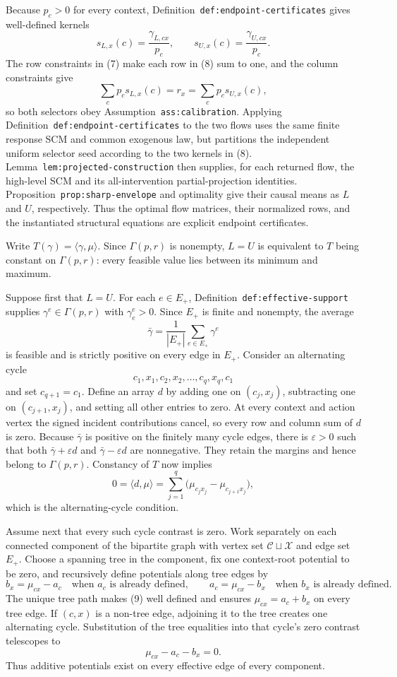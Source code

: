 Because \(p_c>0\) for every context, Definition~\texttt{def:endpoint-certificates} gives well-defined kernels
\[
s_{L,x}(c)=\frac{\gamma_{L,cx}}{p_c},
\qquad
s_{U,x}(c)=\frac{\gamma_{U,cx}}{p_c}.
\tag{8}
\]
The row constraints in (7) make each row in (8) sum to one, and the column constraints give
\[
\sum_cp_cs_{L,x}(c)=r_x
=\sum_cp_cs_{U,x}(c),
\]
so both selectors obey Assumption~\texttt{ass:calibration}.  Applying Definition~\texttt{def:endpoint-certificates} to the two flows uses the same finite response SCM and common exogenous law, but partitions the independent uniform selector seed according to the two kernels in (8).  Lemma~\texttt{lem:projected-construction} then supplies, for each returned flow, the high-level SCM and its all-intervention partial-projection identities.  Proposition~\texttt{prop:sharp-envelope} and optimality give their causal means as \(L\) and \(U\), respectively.  Thus the optimal flow matrices, their normalized rows, and the instantiated structural equations are explicit endpoint certificates.

Write \(T(\gamma)=\langle\gamma,\mu\rangle\).  Since \(\Gamma(p,r)\) is nonempty, \(L=U\) is equivalent to \(T\) being constant on \(\Gamma(p,r)\): every feasible value lies between its minimum and maximum.

Suppose first that \(L=U\).  For each \(e\in E_+\), Definition~\texttt{def:effective-support} supplies \(\gamma^{e}\in\Gamma(p,r)\) with \(\gamma^{e}_e>0\).  Since \(E_+\) is finite and nonempty, the average
\[
\bar\gamma=\frac{1}{|E_+|}\sum_{e\in E_+}\gamma^e
\]
is feasible and is strictly positive on every edge in \(E_+\).  Consider an alternating cycle
\[
c_1,x_1,c_2,x_2,\ldots,c_q,x_q,c_1
\]
and set \(c_{q+1}=c_1\).  Define an array \(d\) by adding one on \((c_j,x_j)\), subtracting one on \((c_{j+1},x_j)\), and setting all other entries to zero.  At every context and action vertex the signed incident contributions cancel, so every row and column sum of \(d\) is zero.  Because \(\bar\gamma\) is positive on the finitely many cycle edges, there is \(\varepsilon>0\) such that both \(\bar\gamma+\varepsilon d\) and \(\bar\gamma-\varepsilon d\) are nonnegative.  They retain the margins and hence belong to \(\Gamma(p,r)\).  Constancy of \(T\) now implies
\[
0=\langle d,\mu\rangle
=\sum_{j=1}^q\bigl(\mu_{c_jx_j}-\mu_{c_{j+1}x_j}\bigr),
\]
which is the alternating-cycle condition.

Assume next that every such cycle contrast is zero.  Work separately on each connected component of the bipartite graph with vertex set \(\mathcal C\sqcup\mathcal X\) and edge set \(E_+\).  Choose a spanning tree in the component, fix one context-root potential to be zero, and recursively define potentials along tree edges by
\[
b_x=\mu_{cx}-a_c\quad\text{when }a_c\text{ is already defined},
\qquad
a_c=\mu_{cx}-b_x\quad\text{when }b_x\text{ is already defined}.
\tag{9}
\]
The unique tree path makes (9) well defined and ensures \(\mu_{cx}=a_c+b_x\) on every tree edge.  If \((c,x)\) is a non-tree edge, adjoining it to the tree creates one alternating cycle.  Substitution of the tree equalities into that cycle's zero contrast telescopes to
\[
\mu_{cx}-a_c-b_x=0.
\]
Thus additive potentials exist on every effective edge of every component.

